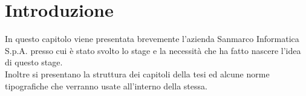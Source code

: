 
\chapter{Introduzione}
\label{cap:introduzione}

In questo capitolo viene presentata brevemente l'azienda Sanmarco Informatica S.p.A. presso cui è stato svolto lo stage e la necessità che ha fatto nascere l'idea di questo stage.\\
Inoltre si presentano la struttura dei capitoli della tesi ed alcune norme tipografiche che verranno usate all'interno della stessa. 






